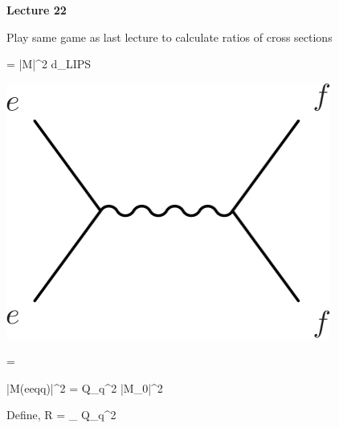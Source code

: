 
\usepackage{braket}
\usepackage{bbm}
\usepackage{relsize}
\usepackage{tcolorbox}




\usepackage{fancyhdr}

\fancyhf{}


\thispagestyle{fancy}

\begin{center}
{\huge \textbf{Lecture 22}}
\end{center}

{\fontsize{14}{16}\selectfont


Play same game as last lecture to calculate ratios of cross sections

\begin{minipage}{0.6\textwidth}
\be
\sigma =   |M|^2 d\Pi_{LIPS}
\ee
\end{minipage} \hfill
\begin{minipage}{0.3\textwidth}
\includegraphics[width=0.8\textwidth]{./eeToff.pdf}
\end{minipage} 


\be
{} = 
\ee

\be
|M(ee\rightarrow qq)|^2 = Q_q^2 |M_0|^2
\ee

Define,
\be
R \equiv {} = \sum_{} Q_q^2
\ee

}
